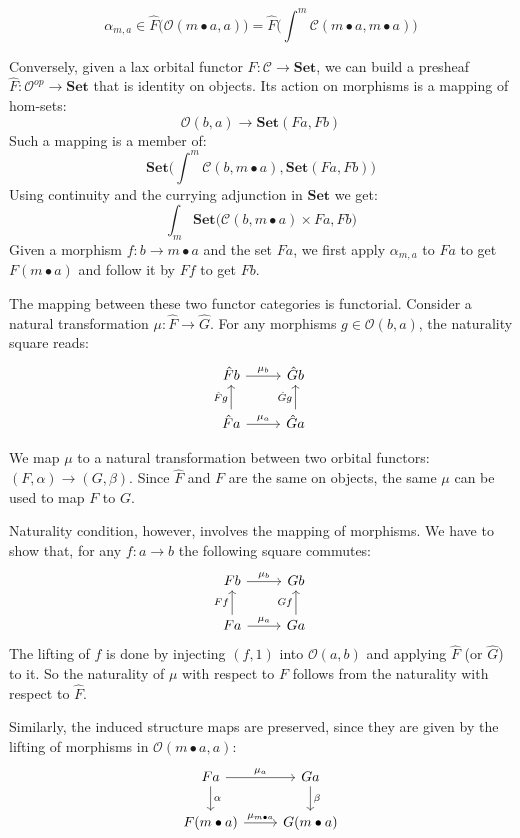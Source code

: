 \documentclass[11pt]{amsart}
\newcommand{\cat}[1]{\mathcal{#1}}%
\newcommand{\Cat}[1]{\mathbf{#1}}%
\newcommand{\Set}{\Cat{Set}}
\begin{document}
\[ \alpha_{m, a} \in \hat F \big(\cat O (m \bullet a, a)\big) = \hat F\big(\int^m \cat C (m \bullet a, m \bullet a) \big)\]

Conversely, given a lax orbital functor $F \colon \cat C \to \Set$, we can build a presheaf $\hat F \colon \cat O^{op} \to \Set$ that is identity on objects. Its action on morphisms is a mapping of hom-sets:
\[ \cat O (b, a) \to \Set (F a, F b) \]
Such a mapping is a member of:
\[ \Set \big (\int^m \cat C (b, m \bullet a), \Set (F a, F b) \big) \]
Using continuity and the currying adjunction in $\Set$ we get:
\[ \int_m \Set \big ( \cat C (b, m \bullet a) \times F a, F b \big) \]
Given a morphism $f \colon b \to m \bullet a$ and the set $F a$, we first apply $\alpha_{m, a}$ to $F a$ to get $F (m \bullet a)$ and follow it by $F f$ to get $F b$.

The mapping between these two functor categories is functorial. Consider a natural transformation $\mu \colon \hat F \to \hat G$. For any morphisms $g \in \cat O(b, a)$, the naturality square reads:
\[
\begin{tikzcd}
\hat F b
\arrow[r, "\mu_b"]
& \hat G b
\\
\hat F a
\arrow[u, "\hat F g"]
\arrow[r, "\mu_a"]
& \hat G a
\arrow[u, "\hat G g"]
\end{tikzcd}
\]

We map $\mu$ to a natural transformation between two orbital functors: $(F, \alpha) \to (G, \beta)$. Since $\hat F$ and $F$ are the same on objects, the same $\mu$ can be used to map $F$ to $G$. 

Naturality condition, however, involves the mapping of morphisms. We have to show that, for any $f \colon a \to b$ the following square commutes:
\[
\begin{tikzcd}
F b
\arrow[r, "\mu_b"]
& G b
\\
F a
\arrow[u, "F f"]
\arrow[r, "\mu_a"]
&  G a
\arrow[u, "G f"]
\end{tikzcd}
\]
The lifting of $f$ is done by injecting $(f, 1)$ into $\cat O(a, b)$ and applying $\hat F$ (or $\hat G$) to it. So the naturality of $\mu$ with respect to $F$ follows from the naturality with respect to $\hat F$.

Similarly, the induced structure maps are preserved, since they are given by the lifting of morphisms in $\cat O(m \bullet a, a)$:
\[
\begin{tikzcd}
F a
\arrow[r, "\mu_a"]
\arrow[d, "\alpha"]
& G a
\arrow[d, "\beta"]
\\ F (m \bullet a) 
\arrow[r, "\mu_{m \bullet a}"]
& G (m \bullet a)
\end{tikzcd}
\]
\end{document}
